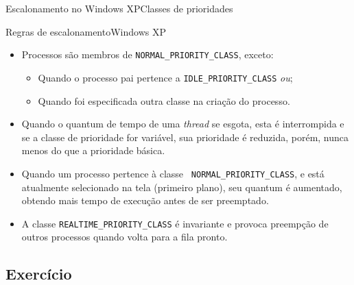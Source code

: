 \begin{frame}[fragile]{Escalonamento no Windows XP}{Classes de prioridades}
\end{frame}

\begin{frame}{Regras de escalonamento}{Windows XP}

  \begin{itemize}
  \item<1-| alert@1> Processos são membros de {\tt NORMAL\_PRIORITY\_CLASS},
    exceto:
    \begin{itemize}
    \item Quando o processo pai pertence a {\tt IDLE\_PRIORITY\_CLASS}
      {\em ou};
    \item Quando foi especificada outra classe na criação do processo.
    \end{itemize}
  \item<2-| alert@2> Quando o quantum de tempo de uma {\em thread} se esgota, esta
    é interrompida e se a classe de prioridade for variável, sua
    prioridade é reduzida, porém, nunca menos do que a prioridade básica.
  \item<3-| alert@3> Quando um processo pertence à classe {\tt
      NORMAL\_PRIORITY\_CLASS}, e está atualmente selecionado na tela
    (primeiro plano), seu quantum é aumentado, obtendo mais tempo de
    execução antes de ser preemptado.
  \item<4-| alert@4> A classe {\tt REALTIME\_PRIORITY\_CLASS} é invariante e
    provoca preempção de outros processos quando volta para a fila pronto.

  \end{itemize}
  
\end{frame}

\subsection{Exercício}

